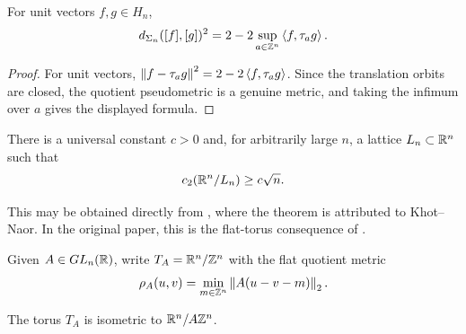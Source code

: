 \begin{lemma}\label{lem:sphere-correlation}
\leanok
{}
For unit vectors $f,g\in H_n$,
\begin{equation}\label{eq:sphere-correlation}
        d_{\Sigma_n}([f],[g])^2
        =2-2\sup_{a\in\mathbb Z^n}\left\langle f,\tau_a g\right\rangle.
\end{equation}
\end{lemma}

\begin{proof}
For unit vectors, $\left\lVert f-\tau_a g\right\rVert^2=2-2\left\langle f,\tau_a g\right\rangle$.  Since the
translation orbits are closed, the quotient pseudometric is a genuine metric,
and taking the infimum over $a$ gives the displayed formula.
\end{proof}

\begin{theorem}
\label{thm:khot-naor-flat-torus}
\leanok
{}
There is a universal constant $c>0$ and, for arbitrarily large $n$, a lattice
$L_n\subset\mathbb R^n$ such that
\begin{equation}\label{eq:KN}
        c_2(\mathbb R^n/L_n)\ge c\sqrt n .
\end{equation}
\end{theorem}

This may be obtained directly from \cite[Theorem~1.1 and the paragraph following
it]{HavivRegev}, where the theorem is attributed to Khot--Naor.  In the original
paper, this is the flat-torus consequence of \cite[Theorem~5.1 and
Corollary~5.2]{KhotNaor}.

\begin{definition}\label{def:flat-torus-metric}
\leanok
Given $A\in GL_n(\mathbb R)$, write $T_A=\mathbb R^n/\mathbb Z^n$ with the flat quotient metric
\begin{equation}\label{eq:rhoA}
        \rho_A(u,v)=\min_{m\in\mathbb Z^n}\left\lVert A(u-v-m)\right\rVert_2.
\end{equation}
\end{definition}

\begin{lemma}
\label{lem:flat-torus-unit-lattice-isometry}
\leanok
{}
The torus $T_A$ is isometric to $\mathbb R^n/A\mathbb Z^n$.
\end{lemma}


